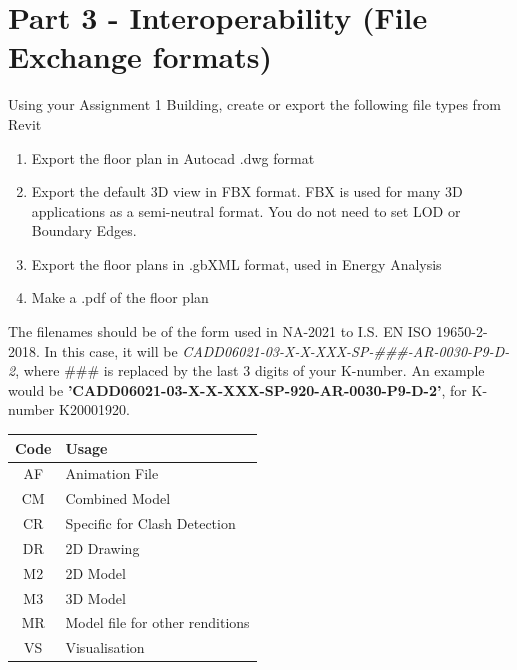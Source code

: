 \newpage

\section*{Part 3 - Interoperability (File Exchange formats)}

Using your Assignment 1 Building, create or export the following file types from Revit
\begin{enumerate}
	\item Export the floor plan in Autocad .dwg format
	\item Export the default 3D view in FBX format.  FBX is used for many 3D applications as a semi-neutral format.  You do not need to set LOD or Boundary Edges.
	\item Export the floor plans in .gbXML format, used in Energy Analysis
	\item Make a .pdf of the floor plan
\end{enumerate}
The filenames should be of the form used in NA-2021 to I.S. EN ISO 19650-2-2018.  In this case, it will be \textit{CADD06021-03-X-X-XXX-SP-\#\#\#-AR-0030-P9-D-2}, where \#\#\# is replaced by the last 3 digits of your K-number. An example would be \textbf{'CADD06021-03-X-X-XXX-SP-920-AR-0030-P9-D-2'}, for K-number K20001920. \\

\begin{tabularx}{\textwidth}{ |c|X| }
	\hline
	\textbf{Code} & \textbf{Usage} \\
	\hline 
	AF  & Animation File  \\
	CM  & Combined Model  \\
	CR  & Specific for Clash Detection  \\
	DR  & 2D Drawing  \\
	M2  & 2D Model  \\
	M3  & 3D Model  \\
	MR  & Model file for other renditions  \\
	VS  & Visualisation  \\
	\hline
\end{tabularx}



